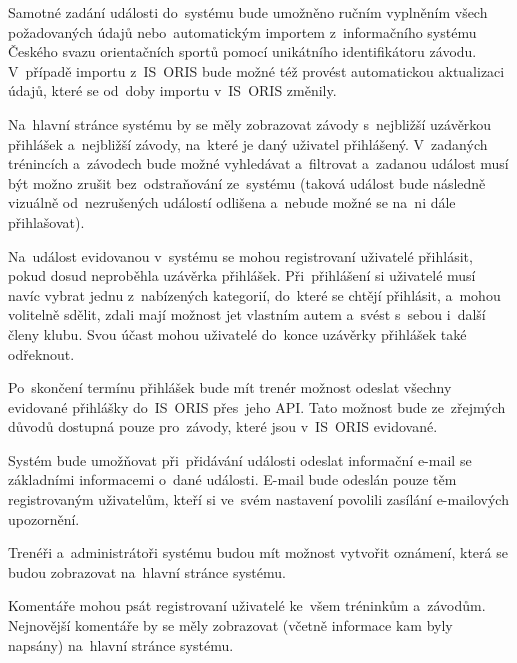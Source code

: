 \begin{enumerate}[label=\textcolor{decoration}{\textbf{F\arabic*}}, leftmargin=6mm]
	Samotné zadání události do~systému bude umožněno ručním vyplněním všech požadovaných údajů nebo~automatickým importem z~informačního systému Českého svazu orientačních sportů pomocí unikátního identifikátoru závodu. V~případě importu z~IS~ORIS bude možné též provést automatickou aktualizaci údajů, které se od~doby importu v~IS~ORIS změnily.

	Na~hlavní stránce systému by se měly zobrazovat závody s~nejbližší uzávěrkou přihlášek a~nejbližší závody, na~které je daný uživatel přihlášený. V~zadaných trénincích a~závodech bude možné vyhledávat a~filtrovat a~zadanou událost musí být možno zrušit bez~odstraňování ze~systému (taková událost bude následně vizuálně od~nezrušených událostí odlišena a~nebude možné se na~ni dále přihlašovat).

	Na~událost evidovanou v~systému se mohou registrovaní uživatelé přihlásit, pokud dosud neproběhla uzávěrka přihlášek. Při~přihlášení si uživatelé musí navíc vybrat jednu z~nabízených kategorií, do~které se chtějí přihlásit, a~mohou volitelně sdělit, zdali mají možnost jet vlastním autem a~svést s~sebou i~další členy klubu. Svou účast mohou uživatelé do~konce uzávěrky přihlášek také odřeknout.

	Po~skončení termínu přihlášek bude mít trenér možnost odeslat všechny evidované přihlášky do~IS~ORIS přes~jeho API. Tato možnost bude ze~zřejmých důvodů dostupná pouze pro~závody, které jsou v~IS~ORIS evidované.

	Systém bude umožňovat při~přidávání události odeslat informační e-mail se základními informacemi o~dané události. E-mail bude odeslán pouze těm registrovaným uživatelům, kteří si ve~svém nastavení povolili zasílání e-mailových upozornění.

	Trenéři a~administrátoři systému budou mít možnost vytvořit oznámení, která se budou zobrazovat na~hlavní stránce systému.

	Komentáře mohou psát registrovaní uživatelé ke~všem tréninkům a~závodům. Nejnovější komentáře by se měly zobrazovat (včetně informace kam byly napsány) na~hlavní stránce systému.
\end{enumerate}

